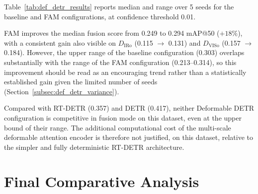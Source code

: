 \documentclass[12pt, a4paper]{article}
\begin{document}
Table~\ref{tab:def_detr_results} reports median and range over 5 seeds for the baseline and FAM configurations, at confidence threshold 0.01.

\begin{table}[htbp]
\centering
\caption{Deformable DETR (Fusion), confidence threshold 0.01. For Deformable-DETR configurations, values are median~[range] over 5 runs with different seeds; RT-DETR and DETR (standard, deterministic attention) are reported as single runs.}
\label{tab:def_detr_results}
\end{table}

FAM improves the median fusion score from 0.249 to 0.294 mAP@50 ($+18\%$), with a consistent gain also visible on $D_{\text{IRo}}$ (0.115 $\to$ 0.131) and $D_{\text{VISo}}$ (0.157 $\to$ 0.184). However, the upper range of the baseline configuration (0.303) overlaps substantially with the range of the FAM configuration (0.213--0.314), so this improvement should be read as an encouraging trend rather than a statistically established gain given the limited number of seeds (Section~\ref{subsec:def_detr_variance}).

Compared with RT-DETR (0.357) and DETR (0.417), neither Deformable DETR configuration is competitive in fusion mode on this dataset, even at the upper bound of their range. The additional computational cost of the multi-scale deformable attention encoder is therefore not justified, on this dataset, relative to the simpler and fully deterministic RT-DETR architecture.

\newpage
\section{Final Comparative Analysis}
\label{sec:comparison}
\end{document}
